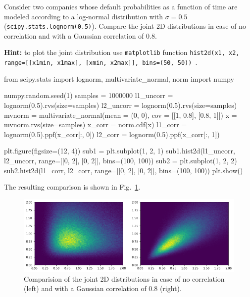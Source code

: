 \begin{question}
Consider two companies whose default probabilities as a function of time are modeled according to a log-normal distribution with $\sigma=0.5$ (\texttt{scipy.stats.lognorm(0.5)}). Compare the joint 2D distributions in case of no correlation and with a Gaussian correlation of 0.8.

\noindent\textbf{Hint:} to plot the joint distribution use \texttt{matplotlib} function \texttt{hist2d(x1, x2, range=[[x1min, x1max], [xmin, x2max]], bins=(50, 50)) }.
\end{question}

\cprotEnv\begin{solution}
\begin{ipython}
from scipy.stats import lognorm, multivariate_normal, norm
import numpy

numpy.random.seed(1)
samples = 1000000
l1_uncorr = lognorm(0.5).rvs(size=samples)
l2_uncorr = lognorm(0.5).rvs(size=samples)
mvnorm = multivariate_normal(mean = (0, 0), 
                             cov = [[1, 0.8],
                                    [0.8, 1]])
x = mvnorm.rvs(size=samples)
x_corr = norm.cdf(x)
l1_corr = lognorm(0.5).ppf(x_corr[:, 0])
l2_corr = lognorm(0.5).ppf(x_corr[:, 1])

plt.figure(figsize=(12, 4))
sub1 = plt.subplot(1, 2, 1)
sub1.hist2d(l1_uncorr, l2_uncorr, range=[[0, 2], [0, 2]], bins=(100, 100))
sub2 = plt.subplot(1, 2, 2)
sub2.hist2d(l1_corr, l2_corr, range=[[0, 2], [0, 2]], bins=(100, 100))
plt.show()
\end{ipython}
\noindent 
The resulting comparison is shown in Fig.~\ref{fig:joint_2d}.
\begin{figure}[htbp]
\begin{center}
	\includegraphics[width=0.9\linewidth]{figures/copula_lognormal.png}
\end{center}
\caption{Comparision of the joint 2D distributions in case of no correlation (left) and with a Gaussian correlation of 0.8 (right).}
\label{fig:joint_2d}
\end{figure}


\end{solution}
